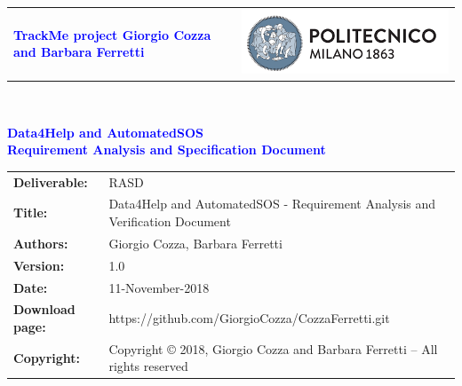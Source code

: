
\usepackage{hyperref}
\usepackage{inconsolata}
\usepackage{listings}
\usepackage{alloy-style}

\hypersetup{
	colorlinks = true,
	linkcolor = black
}



\begin{titlepage}



{\begin{table}[t!]
\centering
\begin{tabu} to \textwidth { X[1.3,r,p] X[1.7,l,p] }
\textcolor{Blue}
{\textbf{\small{TrackMe project Giorgio Cozza and Barbara Ferretti}}} & \includegraphics[scale=0.5]{Images/PolimiLogo}
\end{tabu}
\end{table}}~\\ [7cm]


\begin{center}

{\textcolor{Blue}{\textbf{\Huge{Data4Help and AutomatedSOS}}}} \\ [0,5cm]
{\textcolor{Blue}{\textbf{\LARGE{Requirement Analysis and Specification Document}}}} \\ [1cm]


\end{center}

\end{titlepage}

\begin{table}[h!]
\begin{tabu} to \textwidth { X[0.3,r,p] X[0.7,l,p] }
\hline

\textbf{Deliverable:} & RASD\\
\textbf{Title:} & Data4Help and AutomatedSOS - Requirement Analysis and Verification Document \\
\textbf{Authors:} & Giorgio Cozza, Barbara Ferretti \\
\textbf{Version:} & 1.0 \\ 
\textbf{Date:} & 11-November-2018 \\
\textbf{Download page:} & https://github.com/GiorgioCozza/CozzaFerretti.git \\
\textbf{Copyright:} & Copyright © 2018, Giorgio Cozza and Barbara Ferretti – All rights reserved \\
\hline
\end{tabu}
\end{table}




